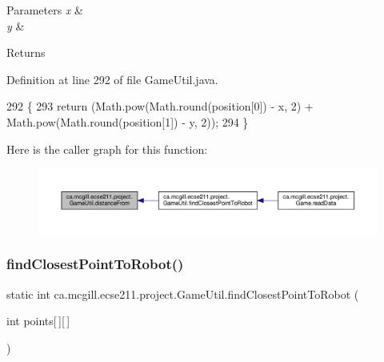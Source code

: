 \begin{DoxyParams}{Parameters}
{\em x} & \\
\hline
{\em y} & \\
\hline
\end{DoxyParams}
\begin{DoxyReturn}{Returns}

\end{DoxyReturn}


Definition at line 292 of file Game\+Util.\+java.


\begin{DoxyCode}
292                                                                      \{
293     \textcolor{keywordflow}{return} (Math.pow(Math.round(position[0]) - x, 2) + Math.pow(Math.round(position[1]) - y, 2));
294   \}
\end{DoxyCode}
Here is the caller graph for this function\+:\nopagebreak
\begin{figure}[H]
\begin{center}
\leavevmode
\includegraphics[width=350pt]{classca_1_1mcgill_1_1ecse211_1_1project_1_1_game_util_a6fb324a3d5e42414c83dfd8bd5910b56_icgraph}
\end{center}
\end{figure}
\mbox{\label{classca_1_1mcgill_1_1ecse211_1_1project_1_1_game_util_a6e0ee94b800ca3727ca8009782abda14}} 
\subsubsection{\texorpdfstring{find\+Closest\+Point\+To\+Robot()}{findClosestPointToRobot()}}
{\footnotesize\ttfamily static int ca.\+mcgill.\+ecse211.\+project.\+Game\+Util.\+find\+Closest\+Point\+To\+Robot (\begin{DoxyParamCaption}\item[{int}]{points\mbox{[}$\,$\mbox{]}\mbox{[}$\,$\mbox{]} }\end{DoxyParamCaption})\hspace{0.3cm}{\ttfamily [static]}}


